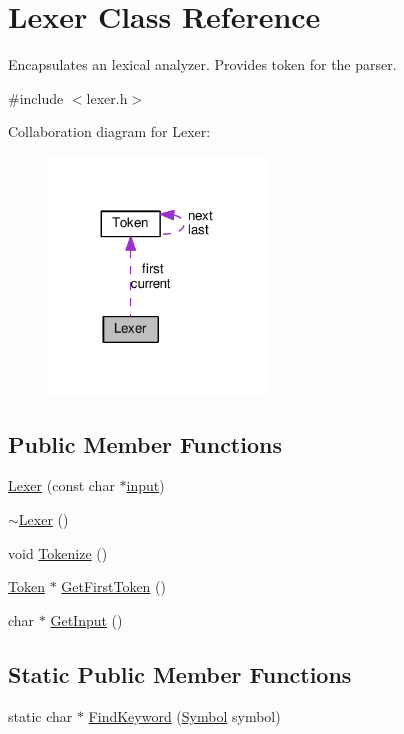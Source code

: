 \hypertarget{classLexer}{}\section{Lexer Class Reference}
\label{classLexer}


Encapsulates an lexical analyzer. Provides token for the parser.  




{\ttfamily \#include $<$lexer.\+h$>$}



Collaboration diagram for Lexer\+:\nopagebreak
\begin{figure}[H]
\begin{center}
\leavevmode
\includegraphics[width=164pt]{classLexer__coll__graph}
\end{center}
\end{figure}
\subsection*{Public Member Functions}
\begin{DoxyCompactItemize}
\item 
\hyperlink{classLexer_a8e12946738ee015bac381da30e2b03b0}{Lexer} (const char $\ast$\hyperlink{classLexer_a9ef909535b14de749d95e5a48217f1c9}{input})
\item 
\hyperlink{classLexer_ad26a84af23d8d303723e36e83fc4e556}{$\sim$\+Lexer} ()
\item 
void \hyperlink{classLexer_a02696cb1f974ae74116c2b746dcba365}{Tokenize} ()
\item 
\hyperlink{structToken}{Token} $\ast$ \hyperlink{classLexer_afbb12eaae7cff3bd2960f444cfe98f69}{Get\+First\+Token} ()
\item 
char $\ast$ \hyperlink{classLexer_a3032cbeb851294bccd61b722d9a86265}{Get\+Input} ()
\end{DoxyCompactItemize}
\subsection*{Static Public Member Functions}
\begin{DoxyCompactItemize}
\item 
static char $\ast$ \hyperlink{classLexer_affd4bac61db830383302be71198a372a}{Find\+Keyword} (\hyperlink{lex_8h_a7feef761cd73fac6e25b8bb80d2c4e54}{Symbol} symbol)
\end{DoxyCompactItemize}
